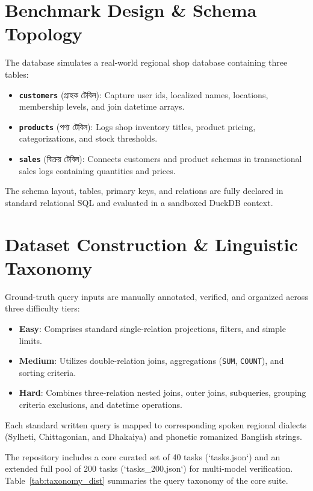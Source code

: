 \documentclass{article}
\begin{document}
\section{Benchmark Design & Schema Topology}
The database simulates a real-world regional shop database containing three tables:
\begin{itemize}
    \item \textbf{\texttt{customers}} (গ্রাহক টেবিল): Capture user ids, localized names, locations, membership levels, and join datetime arrays.
    \item \textbf{\texttt{products}} (পণ্য টেবিল): Logs shop inventory titles, product pricing, categorizations, and stock thresholds.
    \item \textbf{\texttt{sales}} (বিক্রয় টেবিল): Connects customers and product schemas in transactional sales logs containing quantities and prices.
\end{itemize}

The schema layout, tables, primary keys, and relations are fully declared in standard relational SQL and evaluated in a sandboxed DuckDB context.

\section{Dataset Construction & Linguistic Taxonomy}
Ground-truth query inputs are manually annotated, verified, and organized across three difficulty tiers:
\begin{itemize}
    \item \textbf{Easy}: Comprises standard single-relation projections, filters, and simple limits.
    \item \textbf{Medium}: Utilizes double-relation joins, aggregations (\texttt{SUM}, \texttt{COUNT}), and sorting criteria.
    \item \textbf{Hard}: Combines three-relation nested joins, outer joins, subqueries, grouping criteria exclusions, and datetime operations.
\end{itemize}

Each standard written query is mapped to corresponding spoken regional dialects (Sylheti, Chittagonian, and Dhakaiya) and phonetic romanized Banglish strings.

The repository includes a core curated set of 40 tasks (`tasks.json`) and an extended full pool of 200 tasks (`tasks_200.json`) for multi-model verification. Table~\ref{tab:taxonomy_dist} summaries the query taxonomy of the core suite.
\end{document}
